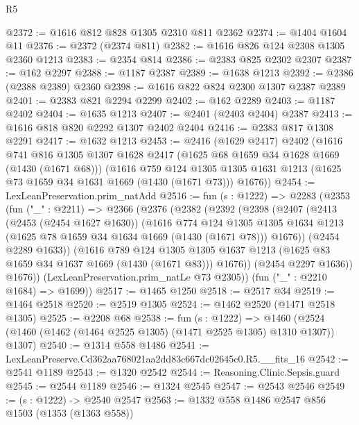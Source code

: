 \begin{lexlean}{R5}
\begin{coremodule}
@2372 := @1616 @812 @828 @1305 @2310 @811 @2362
@2374 := @1404 @1604 @11
@2376 := @2372 (@2374 @811)
@2382 := @1616 @826 @124 @2308 @1305 @2360 @1213
@2383 := @2354 @814
@2386 := @2383 @825 @2302 @2307
@2387 := @162 @2297
@2388 := @1187 @2387
@2389 := @1638 @1213
@2392 := @2386 (@2388 @2389) @2360
@2398 := @1616 @822 @824 @2300 @1307 @2387 @2389
@2401 := @2383 @821 @2294 @2299
@2402 := @162 @2289
@2403 := @1187 @2402
@2404 := @1635 @1213
@2407 := @2401 (@2403 @2404) @2387
@2413 := @1616 @818 @820 @2292 @1307 @2402 @2404
@2416 := @2383 @817 @1308 @2291
@2417 := @1632 @1213
@2453 := @2416
    (@1629 @2417)
    @2402
    (@1616
      @741
      @816
      @1305
      @1307
      @1628
      @2417
      (@1625 @68 @1659 @34 @1628 @1669 (@1430 (@1671 @68)))
      (@1616
        @759
        @124
        @1305
        @1305
        @1631
        @1213
        (@1625 @73 @1659 @34 @1631 @1669 (@1430 (@1671 @73)))
        @1676))
@2454 := LexLeanPreservation.prim_natAdd
@2516 := fun (s : @1222) =>
  @2283
    (@2353
      (fun ("_" : @2211) =>
      @2366
        (@2376
          (@2382
            (@2392
              (@2398
                (@2407
                  (@2413
                    (@2453 (@2454 @1627 @1630))
                    (@1616
                      @774
                      @124
                      @1305
                      @1305
                      @1634
                      @1213
                      (@1625 @78 @1659 @34 @1634 @1669 (@1430 (@1671 @78)))
                      @1676))
                  (@2454 @2289 @1633))
                (@1616
                  @789
                  @124
                  @1305
                  @1305
                  @1637
                  @1213
                  (@1625 @83 @1659 @34 @1637 @1669 (@1430 (@1671 @83)))
                  @1676))
              (@2454 @2297 @1636))
            @1676))
        (LexLeanPreservation.prim_natLe @73 @2305))
      (fun ("_" : @2210 @1684) => @1699))
@2517 := @1465 @1250
@2518 := @2517 @34
@2519 := @1464 @2518
@2520 := @2519 @1305
@2524 := @1462 @2520 (@1471 @2518 @1305)
@2525 := @2208 @68
@2538 := fun (s : @1222) =>
  @1460 (@2524 (@1460 (@1462 (@1464 @2525 @1305) (@1471 @2525 @1305) @1310 @1307)) @1307)
@2540 := @1314 @558 @1486
@2541 := LexLeanPreserve.Cd362aa768021aa2dd83c667dc02645c0.R5.__fits_16
@2542 := @2541 @1189
@2543 := @1320 @2542
@2544 := Reasoning.Clinic.Sepsis.guard
@2545 := @2544 @1189
@2546 := @1324 @2545
@2547 := @2543 @2546
@2549 := (s : @1222) -> @2540 @2547
@2563 := @1332
    @558
    @1486
    @2547
    @856
    @1503
    (@1353 (@1363 @558))

\end{coremodule}
\end{lexlean}

